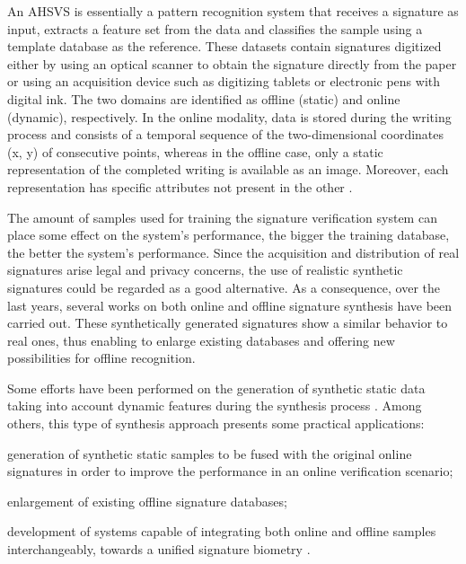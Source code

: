 An AHSVS is essentially a pattern recognition system that receives a signature as input, extracts a feature set from the data and classifies the sample using a template database as the reference. These datasets contain signatures digitized either by using an optical scanner to obtain the signature directly from the paper or using an acquisition device such as digitizing tablets or electronic pens with digital ink. The two domains are identified as offline (static) and online (dynamic), respectively.  In the online modality, data is stored during the writing process and consists of a temporal sequence of the two-dimensional coordinates (x, y) of consecutive points, whereas in the offline case, only a static representation of the completed writing is available as an image. Moreover, each representation has specific attributes not present in the other \cite{viard1999ireste}. 

The amount of samples used for training the signature verification system can place some effect on the system's performance, the bigger the training database, the better the system's performance. Since the acquisition and distribution of real signatures arise legal and privacy concerns, the use of realistic synthetic signatures could be regarded as a good alternative. As a consequence, over the last years, several works on both online \cite{galbally2009synthetic, galbally2012synthetic} and offline \cite{ferrer2013synthetic, ferrer2013realistic} signature synthesis have been carried out. These synthetically generated signatures show a similar behavior to real ones, thus enabling to enlarge existing databases and offering new possibilities for offline recognition.

Some efforts have been performed on the generation of synthetic static data taking into account dynamic features during the synthesis process \cite{diaz2014generation}. Among others, this type of synthesis approach presents some practical applications:
\begin{inlinelist}
  \item generation of synthetic static samples to be fused with the original online signatures in order to improve the performance in an online verification scenario;
  \item enlargement of existing offline signature databases;
  \item development of systems capable of integrating both online and offline samples interchangeably, towards a unified signature biometry \cite{chapter}.
\end{inlinelist}

